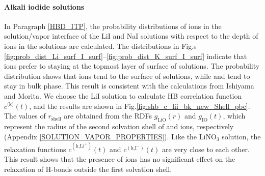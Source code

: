
\FloatBarrier
\paragraph{Alkali iodide solutions}
In Paragraph \ref{HBD_ITP}, the probability distributions of ions in the solution/vapor interface of the LiI and NaI solutions with respect to the depth 
of ions in the solutions %
are calculated. 
The distributions in Fig.s \ref{fig:prob_dist_Li_surf_I_surf}--\ref{fig:prob_dist_K_surf_I_surf} indicate
that \I ions prefer to staying at the topmost layer of surface of solutions.
The probability distribution shows that \I ions tend to the surface of solutions, while \Na and \Li tend to stay in bulk phase. 
This result is consistent with the calculations from Ishiyama and Morita\cite{TI07,Ishiyama2014}.
We choose the LiI solution to calculate HB correlation function $c^\text{(k)}(t)$,
and the results are shown in Fig.\ref{fig:shb_c_lii_bk_new_Shell_pbc}. The values of $r_\text{shell}$ are obtained from
the RDFs $g_\text{LiO}(r)$ and $g_\text{IO}(t)$, which represent the radius of the second solvation shell of \Li and \I ions, respectively 
(Appendix \ref{SOLUTION_VAPOR_PROPERTIES}). 
Like the LiNO$_3$ solution, the relaxation functions $c^{(\text{k,Li}^+)}(t)$ and 
$c^{(\text{k,I}^-)}(t)$ are very close to each other. 
This result shows that the presence of ions has no significant effect on the relaxation of H-bonds outside the first solvation shell.

